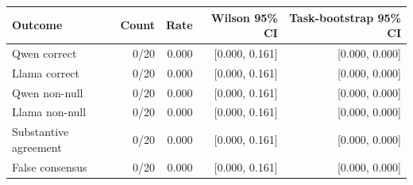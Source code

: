 \begin{tabular}{lrrrr}
\toprule
Outcome & Count & Rate & Wilson 95\% CI & Task-bootstrap 95\% CI \\
\midrule
Qwen correct & 0/20 & 0.000 & [0.000, 0.161] & [0.000, 0.000] \\
Llama correct & 0/20 & 0.000 & [0.000, 0.161] & [0.000, 0.000] \\
Qwen non-null & 0/20 & 0.000 & [0.000, 0.161] & [0.000, 0.000] \\
Llama non-null & 0/20 & 0.000 & [0.000, 0.161] & [0.000, 0.000] \\
Substantive agreement & 0/20 & 0.000 & [0.000, 0.161] & [0.000, 0.000] \\
False consensus & 0/20 & 0.000 & [0.000, 0.161] & [0.000, 0.000] \\
\bottomrule
\end{tabular}
